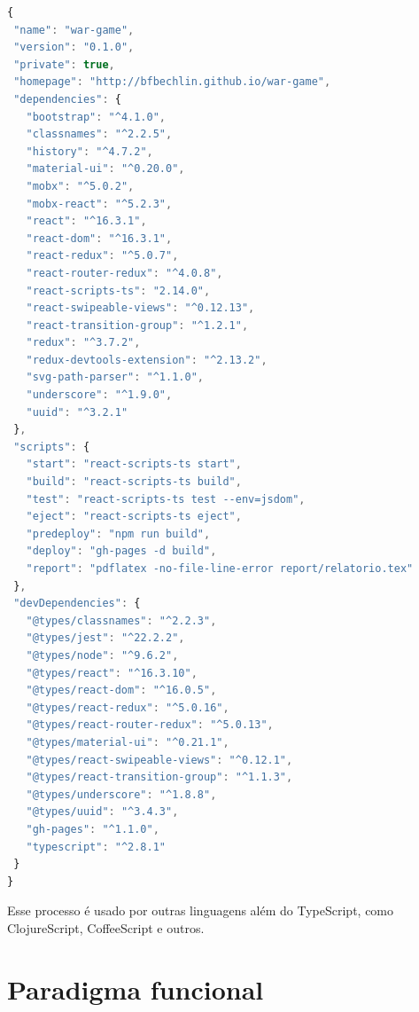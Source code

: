 \documentclass[rel_mlp]{iiufrgs}
\begin{document}
\begin{lstlisting}[language=JavaScript]
{
 "name": "war-game",
 "version": "0.1.0",
 "private": true,
 "homepage": "http://bfbechlin.github.io/war-game",
 "dependencies": {
   "bootstrap": "^4.1.0",
   "classnames": "^2.2.5",
   "history": "^4.7.2",
   "material-ui": "^0.20.0",
   "mobx": "^5.0.2",
   "mobx-react": "^5.2.3",
   "react": "^16.3.1",
   "react-dom": "^16.3.1",
   "react-redux": "^5.0.7",
   "react-router-redux": "^4.0.8",
   "react-scripts-ts": "2.14.0",
   "react-swipeable-views": "^0.12.13",
   "react-transition-group": "^1.2.1",
   "redux": "^3.7.2",
   "redux-devtools-extension": "^2.13.2",
   "svg-path-parser": "^1.1.0",
   "underscore": "^1.9.0",
   "uuid": "^3.2.1"
 },
 "scripts": {
   "start": "react-scripts-ts start",
   "build": "react-scripts-ts build",
   "test": "react-scripts-ts test --env=jsdom",
   "eject": "react-scripts-ts eject",
   "predeploy": "npm run build",
   "deploy": "gh-pages -d build",
   "report": "pdflatex -no-file-line-error report/relatorio.tex"
 },
 "devDependencies": {
   "@types/classnames": "^2.2.3",
   "@types/jest": "^22.2.2",
   "@types/node": "^9.6.2",
   "@types/react": "^16.3.10",
   "@types/react-dom": "^16.0.5",
   "@types/react-redux": "^5.0.16",
   "@types/react-router-redux": "^5.0.13",
   "@types/material-ui": "^0.21.1",
   "@types/react-swipeable-views": "^0.12.1",
   "@types/react-transition-group": "^1.1.3",
   "@types/underscore": "^1.8.8",
   "@types/uuid": "^3.4.3",
   "gh-pages": "^1.1.0",
   "typescript": "^2.8.1"
 }
}
\end{lstlisting}

Esse processo é usado por outras linguagens além do TypeScript, como ClojureScript, CoffeeScript e outros.

\section{Paradigma funcional}
\end{document}
